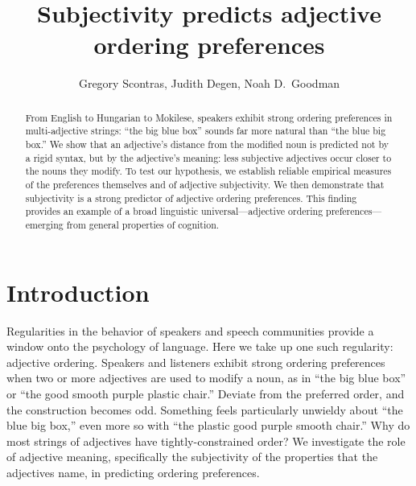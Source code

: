 \documentclass[12pt]{article}
\title{Subjectivity predicts adjective ordering preferences}
\author{Gregory Scontras, Judith Degen, Noah D.~Goodman}
\begin{document}
\maketitle

\begin{abstract}
	From English to Hungarian to Mokilese, speakers exhibit strong ordering preferences in multi-adjective strings: ``the big blue box'' sounds far more natural than ``the blue big box.'' We show that an adjective's distance from the modified noun is predicted not by a rigid syntax, but by the adjective's meaning: less subjective adjectives occur closer to the nouns they modify. To test our hypothesis, we establish reliable empirical measures of the preferences themselves and of adjective subjectivity. We then demonstrate that subjectivity is a strong predictor of adjective ordering preferences. 
	This finding provides an example of a broad linguistic universal---adjective ordering preferences---emerging from general properties of cognition. 
\end{abstract}

\section{Introduction}

Regularities in the behavior of speakers and speech communities provide a window onto the psychology of language. Here we take up one such regularity: adjective ordering. Speakers and listeners exhibit strong ordering preferences when two or more adjectives are used to modify a noun, as in ``the big blue box'' or ``the good smooth purple plastic chair.'' Deviate from the preferred order, and the construction becomes odd. Something feels particularly unwieldy about ``the blue big box,'' even more so with ``the plastic good purple smooth chair.'' 
Why do most strings of adjectives have tightly-constrained order? 
We investigate the role of adjective meaning, specifically the subjectivity of the properties that the adjectives name, in predicting ordering preferences.
\end{document}
